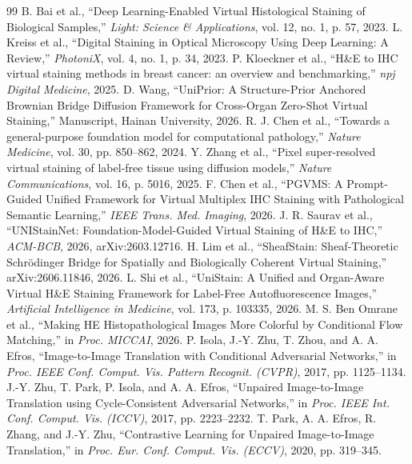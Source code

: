 \documentclass[journal]{IEEEtran}
\begin{document}
\begin{thebibliography}{99}
 B. Bai et al., ``Deep Learning-Enabled Virtual Histological Staining of Biological Samples,'' \textit{Light: Science \& Applications}, vol. 12, no. 1, p. 57, 2023.
 L. Kreiss et al., ``Digital Staining in Optical Microscopy Using Deep Learning: A Review,'' \textit{PhotoniX}, vol. 4, no. 1, p. 34, 2023.
 P. Kloeckner et al., ``H\&E to IHC virtual staining methods in breast cancer: an overview and benchmarking,'' \textit{npj Digital Medicine}, 2025.
 D. Wang, ``UniPrior: A Structure-Prior Anchored Brownian Bridge Diffusion Framework for Cross-Organ Zero-Shot Virtual Staining,'' Manuscript, Hainan University, 2026.
 R. J. Chen et al., ``Towards a general-purpose foundation model for computational pathology,'' \textit{Nature Medicine}, vol. 30, pp. 850--862, 2024.
 Y. Zhang et al., ``Pixel super-resolved virtual staining of label-free tissue using diffusion models,'' \textit{Nature Communications}, vol. 16, p. 5016, 2025.
 F. Chen et al., ``PGVMS: A Prompt-Guided Unified Framework for Virtual Multiplex IHC Staining with Pathological Semantic Learning,'' \textit{IEEE Trans. Med. Imaging}, 2026.
 J. R. Saurav et al., ``UNIStainNet: Foundation-Model-Guided Virtual Staining of H\&E to IHC,'' \textit{ACM-BCB}, 2026, arXiv:2603.12716.
 H. Lim et al., ``SheafStain: Sheaf-Theoretic Schr\"odinger Bridge for Spatially and Biologically Coherent Virtual Staining,'' arXiv:2606.11846, 2026.
 L. Shi et al., ``UniStain: A Unified and Organ-Aware Virtual H\&E Staining Framework for Label-Free Autofluorescence Images,'' \textit{Artificial Intelligence in Medicine}, vol. 173, p. 103335, 2026.
 M. S. Ben Omrane et al., ``Making HE Histopathological Images More Colorful by Conditional Flow Matching,'' in \textit{Proc. MICCAI}, 2026.
 P. Isola, J.-Y. Zhu, T. Zhou, and A. A. Efros, ``Image-to-Image Translation with Conditional Adversarial Networks,'' in \textit{Proc. IEEE Conf. Comput. Vis. Pattern Recognit. (CVPR)}, 2017, pp. 1125--1134.
 J.-Y. Zhu, T. Park, P. Isola, and A. A. Efros, ``Unpaired Image-to-Image Translation using Cycle-Consistent Adversarial Networks,'' in \textit{Proc. IEEE Int. Conf. Comput. Vis. (ICCV)}, 2017, pp. 2223--2232.
 T. Park, A. A. Efros, R. Zhang, and J.-Y. Zhu, ``Contrastive Learning for Unpaired Image-to-Image Translation,'' in \textit{Proc. Eur. Conf. Comput. Vis. (ECCV)}, 2020, pp. 319--345.

\end{thebibliography}
\end{document}
